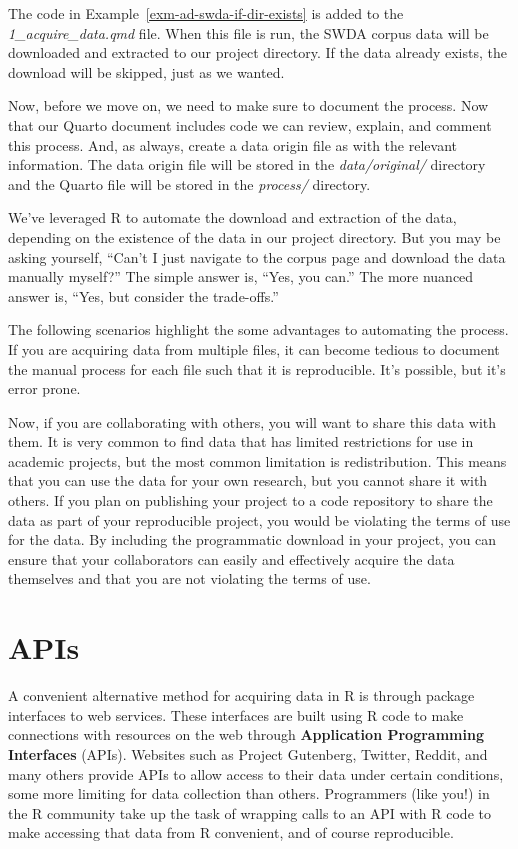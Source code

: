 \documentclass[
  letterpaper,
  DIV=11,
  numbers=noendperiod]{scrreprt}
\theoremstyle{definition}
\theoremstyle{remark}
\begin{document}
The code in Example~\ref{exm-ad-swda-if-dir-exists} is added to the
\emph{1\_acquire\_data.qmd} file. When this file is run, the SWDA corpus
data will be downloaded and extracted to our project directory. If the
data already exists, the download will be skipped, just as we wanted.

Now, before we move on, we need to make sure to document the process.
Now that our Quarto document includes code we can review, explain, and
comment this process. And, as always, create a data origin file as with
the relevant information. The data origin file will be stored in the
\emph{data/original/} directory and the Quarto file will be stored in
the \emph{process/} directory.

We've leveraged R to automate the download and extraction of the data,
depending on the existence of the data in our project directory. But you
may be asking yourself, ``Can't I just navigate to the corpus page and
download the data manually myself?'' The simple answer is, ``Yes, you
can.'' The more nuanced answer is, ``Yes, but consider the trade-offs.''

The following scenarios highlight the some advantages to automating the
process. If you are acquiring data from multiple files, it can become
tedious to document the manual process for each file such that it is
reproducible. It's possible, but it's error prone.

Now, if you are collaborating with others, you will want to share this
data with them. It is very common to find data that has limited
restrictions for use in academic projects, but the most common
limitation is redistribution. This means that you can use the data for
your own research, but you cannot share it with others. If you plan on
publishing your project to a code repository to share the data as part
of your reproducible project, you would be violating the terms of use
for the data. By including the programmatic download in your project,
you can ensure that your collaborators can easily and effectively
acquire the data themselves and that you are not violating the terms of
use.

\section{APIs}\label{sec-apis}

A convenient alternative method for acquiring data in R is through
package interfaces to web services. These interfaces are built using R
code to make connections with resources on the web through
\textbf{Application Programming Interfaces} (APIs). Websites such as
Project Gutenberg, Twitter, Reddit, and many others provide APIs to
allow access to their data under certain conditions, some more limiting
for data collection than others. Programmers (like you!) in the R
community take up the task of wrapping calls to an API with R code to
make accessing that data from R convenient, and of course reproducible.
\end{document}
